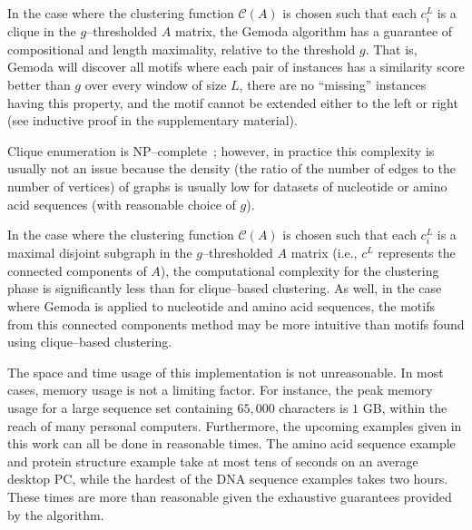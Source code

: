     In the case where the clustering function
    $\mathscr{C}(A)$ is chosen such that each $c_i^{L}$ is
    a clique in the $g$--thresholded $A$ matrix, the
    Gemoda algorithm has a guarantee of compositional
    and length maximality, relative to the threshold
    $g$.  That is, Gemoda will discover all motifs
    where each pair of instances has a similarity
    score better than $g$ over every window of size
    $L$, there are no ``missing'' instances having
    this property, and the motif cannot be extended
    either to the left or right (see inductive proof
    in the supplementary material).

    Clique enumeration is
    NP--complete~\citep{garey1979computers,tomita1989optimal};
    however, in practice this complexity is usually
    not an issue because the density (the ratio of
    the number of edges to the number of vertices) of
    graphs is usually low for datasets of nucleotide
    or amino acid sequences (with reasonable choice
    of $g$).

    In the case where the clustering function
    $\mathscr{C}(A)$ is chosen such that each $c_i^{L}$
    is a maximal disjoint subgraph in the $g$--thresholded
    $A$ matrix (i.e., $c^{L}$ represents the connected components of $A$),
    the computational complexity for
    the clustering phase is significantly less than
    for clique--based clustering.  As well, in the
    case where Gemoda is applied to nucleotide and
    amino acid sequences, the motifs from this connected components
    method may be more
    intuitive than motifs found using clique--based
    clustering.

    The space and time usage of this implementation is not unreasonable.
    In most cases, memory usage is not a limiting factor.  For
    instance, the peak memory usage for a large sequence set containing
    $65,000$ characters is $1$ GB, within the reach of many
    personal computers.  Furthermore, the upcoming examples given in this
    work can all be done in reasonable times.  The amino acid
    sequence example and protein structure example take
    at most tens of seconds on an average desktop PC, while
    the hardest of the DNA sequence examples takes two hours.  These times are
    more than reasonable given the exhaustive guarantees provided by
    the algorithm.


